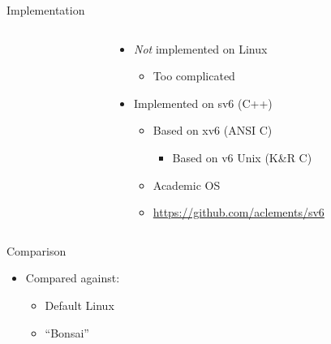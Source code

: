 \documentclass[aspectratio=169]{beamer}
\newcommand{\bi}{\begin{itemize}}
\newcommand{\ei}{\end{itemize}}
\begin{document}
\begin{frame}{Implementation}
  \begin{columns}[T]
    \begin{column}{0.1\textwidth}
      \vspace{2cm}
    \end{column}
    \begin{column}{0.6\textwidth}
      \bi
    \item \emph{Not} implemented on Linux
      \bi
      \pause
    \item Too complicated
      \ei
      \vspace{1em}
      \pause
    \item Implemented on sv6 (C++)
      \bi
      \pause
    \item Based on xv6 (ANSI C)
      \bi
      \pause
    \item Based on v6 Unix (K\&R C)
      \ei
      \pause
    \item Academic OS
      \pause
    \item \url{https://github.com/aclements/sv6}
      \ei
      \ei
    \end{column}
  \end{columns}
\end{frame}

\begin{frame}{Comparison}
  \begin{center}
    \bi
  \item Compared against:
    \bi
    \pause
  \item Default Linux
    \pause
  \item ``Bonsai''
    \ei
    \ei
  \end{center}
\end{frame}
\end{document}
